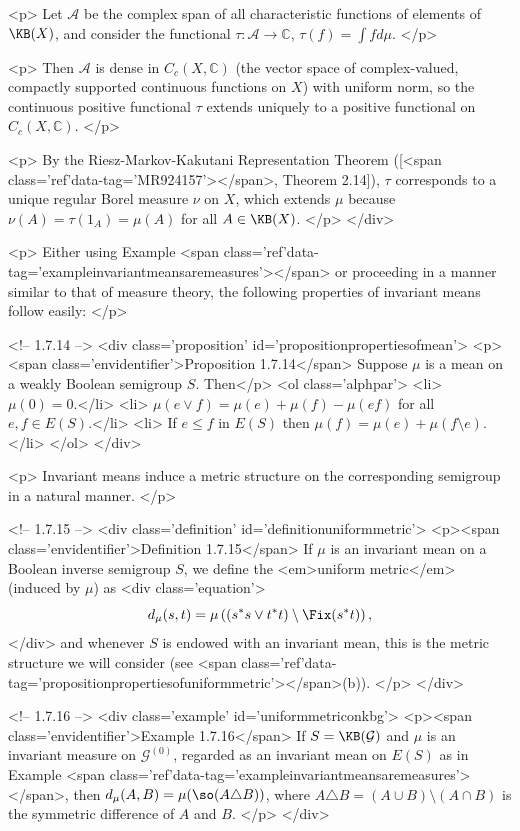 	<p>
	Let $\mathcal{A}$ be the complex span of all characteristic functions of elements of $\KB(X)$, and consider the functional $\tau:\mathcal{A}\to\mathbb{C}$, $\tau(f)=\int fd\mu$.
	</p>

	<p>
	Then $\mathcal{A}$ is dense in $C_c(X,\mathbb{C})$ (the vector space of complex-valued, compactly supported continuous functions on $X$) with uniform norm, so the continuous positive functional $\tau$ extends uniquely to a positive functional on $C_c(X,\mathbb{C})$.
	</p>

	<p>
	By the Riesz-Markov-Kakutani Representation Theorem ([<span class='ref'data-tag='MR924157'></span>, Theorem 2.14]), $\tau$ corresponds to a unique regular Borel measure $\nu$ on $X$, which extends $\mu$ because $\nu(A)=\tau(1_A)=\mu(A)$ for all $A\in\KB(X)$.
	</p>
</div>

<p>
Either using Example <span class='ref'data-tag='exampleinvariantmeansaremeasures'></span> or proceeding in a manner similar to that of measure theory, the following properties of invariant means follow easily:
</p>

<!-- 1.7.14 -->
<div class='proposition' id='propositionpropertiesofmean'>
	<p><span class='envidentifier'>Proposition 1.7.14</span>
	Suppose $\mu$ is a mean on a weakly Boolean semigroup $S$. Then</p>
	<ol class='alphpar'>
		<li> $\mu(0)=0$.</li>
		<li> $\mu(e\lor f)=\mu(e)+\mu(f)-\mu(ef)$ for all $e,f\in E(S)$.</li>
		<li> If $e\leq f$ in $E(S)$ then $\mu(f)=\mu(e)+\mu(f\setminus e)$.</li>
	</ol>
</div>

<p>
Invariant means induce a metric structure on the corresponding semigroup in a natural manner.
</p>

<!-- 1.7.15 -->
<div class='definition' id='definitionuniformmetric'>
	<p><span class='envidentifier'>Definition 1.7.15</span>
	If $\mu$ is an invariant mean on a Boolean inverse semigroup $S$, we define the <em>uniform metric</em> (induced by $\mu$) as
	<div class='equation'>\[
	d_\mu(s,t)=\mu\left((s^*s\lor t^*t)\setminus\Fix(s^*t)\right),
	\]</div>
	and whenever $S$ is endowed with an invariant mean, this is the metric structure we will consider (see <span class='ref'data-tag='propositionpropertiesofuniformmetric'></span>(b)).
	</p>
</div>

<!-- 1.7.16 -->
<div class='example' id='uniformmetriconkbg'>
	<p><span class='envidentifier'>Example 1.7.16</span>
	If $S=\KB(\mathcal{G})$ and $\mu$ is an invariant measure on $\mathcal{G}^{(0)}$, regarded as an invariant mean on $E(S)$ as in Example <span class='ref'data-tag='exampleinvariantmeansaremeasures'></span>, then $d_\mu(A,B)=\mu(\so(A\triangle B))$, where $A\triangle B=(A\cup B)\setminus (A\cap B)$ is the symmetric difference of $A$ and $B$.
	</p>
</div>

